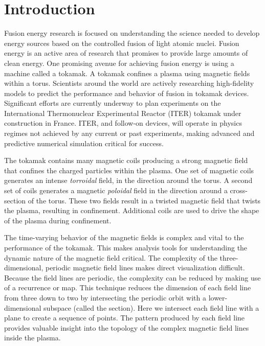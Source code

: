 \section{Introduction}
\label{sec:intro}

%

Fusion energy research is focused on understanding the science needed to develop energy sources based on the controlled fusion of light atomic nuclei. Fusion energy is an active area of research that promises to provide large amounts of clean energy.
One promising avenue for achieving fusion energy is using a machine called a tokamak. A tokamak confines a plasma using magnetic fields within a torus.
Scientists around the world are actively researching high-fidelity models to predict the performance and behavior of fusion in tokamak devices. Significant efforts are currently underway to plan experiments on the International Thermonuclear Experimental Reactor (ITER) tokamak under construction in France.
ITER, and follow-on devices, will operate in physics regimes not achieved by any current or past experiments, making advanced and predictive numerical simulation critical for success.


The tokamak contains many magnetic coils producing a strong magnetic field that confines the charged particles within the plasma. One set of magnetic coils generates an intense  \emph{torroidal} field, in the direction around the torus. A second set of coils generates a magnetic \emph{poloidal} field in the direction around a cross-section of the torus. These two fields result in a twisted magnetic field that twists the plasma, resulting in confinement.  Additional coils are used to drive the shape of the plasma during confinement.

The time-varying behavior of the magnetic fields is complex and vital to the performance of the tokamak. This makes analysis tools for understanding the dynamic nature of the magnetic field critical. The complexity of the three-dimensional, periodic magnetic field lines makes direct visualization difficult.
Because the field lines are periodic, the complexity can be reduced by making use of a recurrence or \poincare map. This technique reduces the dimension of each field line from three down to two by intersecting the periodic orbit with a lower-dimensional subspace (called the \poincare section).
Here we intersect each field line with a plane to create a sequence of points. The pattern produced by each field line provides valuable insight into the topology of the complex magnetic field lines inside the plasma.

